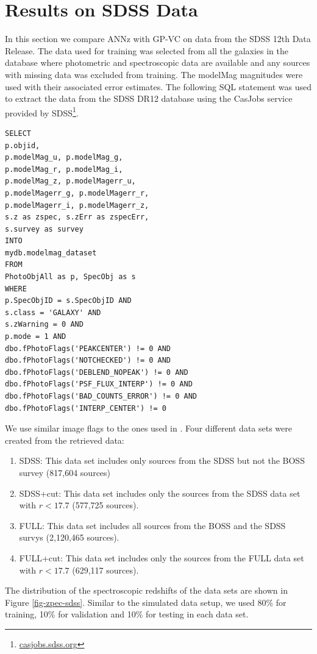 \documentclass[useAMS,usenatbib,fleqn]{mn2e}
\begin{document}
\section{Results on SDSS Data}
\label{sec-experiments-sdss}

In this section we compare {\sc ANNz} with GP-VC on data from the SDSS 12th Data Release. The data used for training was selected from all the galaxies in the database where photometric and spectroscopic data are available and any sources with missing data was excluded from training. The {\selectfont modelMag} magnitudes were used with their associated error estimates. The following SQL statement was used to extract the data from the SDSS DR12 database using the CasJobs service provided by SDSS\footnote{\url{casjobs.sdss.org}}.

\begin{verbatim}
SELECT
p.objid,
p.modelMag_u, p.modelMag_g,
p.modelMag_r, p.modelMag_i,
p.modelMag_z, p.modelMagerr_u,
p.modelMagerr_g, p.modelMagerr_r,
p.modelMagerr_i, p.modelMagerr_z,
s.z as zspec, s.zErr as zspecErr,
s.survey as survey
INTO
mydb.modelmag_dataset
FROM
PhotoObjAll as p, SpecObj as s
WHERE
p.SpecObjID = s.SpecObjID AND
s.class = 'GALAXY' AND 
s.zWarning = 0 AND
p.mode = 1 AND
dbo.fPhotoFlags('PEAKCENTER') != 0 AND
dbo.fPhotoFlags('NOTCHECKED') != 0 AND
dbo.fPhotoFlags('DEBLEND_NOPEAK') != 0 AND
dbo.fPhotoFlags('PSF_FLUX_INTERP') != 0 AND
dbo.fPhotoFlags('BAD_COUNTS_ERROR') != 0 AND
dbo.fPhotoFlags('INTERP_CENTER') != 0
\end{verbatim}

We use similar image flags to the ones used in \citet{brescia2014catalogue}. Four different data sets were created from the retrieved data:
\begin{enumerate}
  \item SDSS: This data set includes only sources from the SDSS but not the BOSS survey (817,604 sources) 
  \item SDSS+cut: This data set includes only the sources from the SDSS data set with $r<17.7$ (577,725 sources).
  \item FULL: This data set includes all sources from the BOSS and the SDSS survys (2,120,465 sources). 
  \item FULL+cut: This data set includes only the sources from the FULL data set with $r<17.7$ (629,117 sources). 
\end{enumerate}


The distribution of the spectroscopic redshifts of the data sets are shown in Figure \ref{fig-zpec-sdss}. Similar to the simulated data setup, we used 80\% for training, 10\% for validation and 10\% for testing in each data set.
\end{document}
